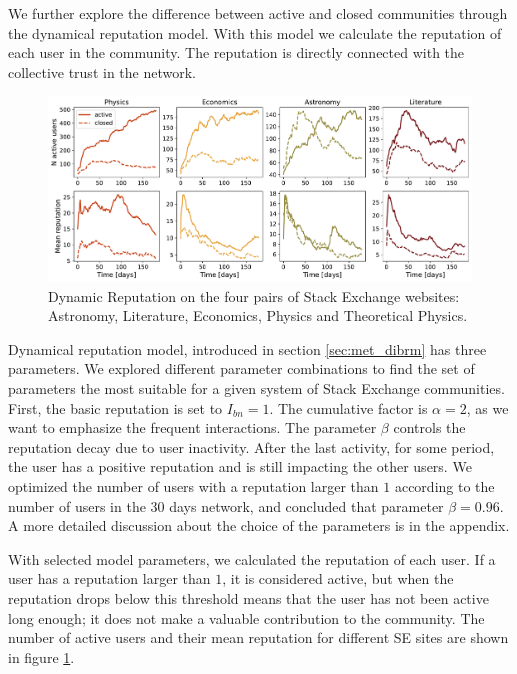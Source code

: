We further explore the difference between active and closed communities through the dynamical reputation model. With this model we calculate the reputation of each user in the community. The reputation is directly connected with the collective trust in the network. 

\begin{figure}[h]
	\centering
	\includegraphics[width=\linewidth]{figures/stackexchange/reputation.pdf}
	\caption{Dynamic Reputation on the four pairs of Stack Exchange websites: Astronomy, Literature, Economics,  Physics and Theoretical Physics.}
	\label{fig:dr6panel}
\end{figure}

Dynamical reputation model, introduced in section \ref{sec:met_dibrm} has three parameters. We explored different parameter combinations to find the set of parameters the most suitable for a given system of Stack Exchange communities. First, the basic reputation is set to $I_{bn}=1$. The cumulative factor is $\alpha=2$, as we want to emphasize the frequent interactions. The parameter $\beta$ controls the reputation decay due to user inactivity. After the last activity, for some period, the user has a positive reputation and is still impacting the other users. We optimized the number of users with a reputation larger than $1$ according to the number of users in the 30 days network, and concluded that parameter $\beta=0.96$. A more detailed discussion about the choice of the parameters is in the appendix. 

With selected model parameters, we calculated the reputation of each user. If a user has a reputation larger than $1$, it is considered active, but when the reputation drops below this threshold means that the user has not been active long enough; it does not make a valuable contribution to the community. The number of active users and their mean reputation for different SE sites are shown in figure \ref{fig:dr6panel}. 


